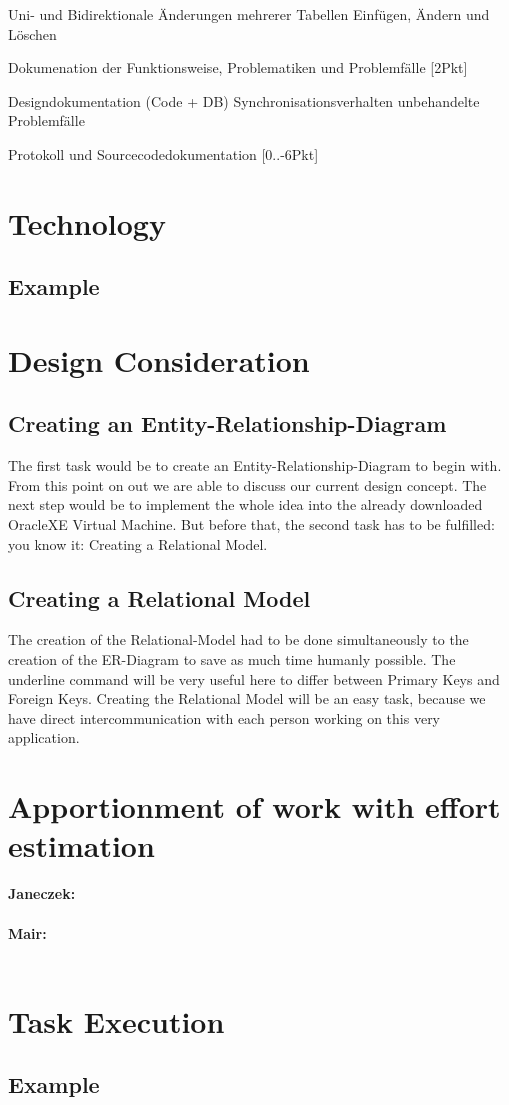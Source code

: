 \documentclass[11pt,a4paper]{article}
\begin{document}
Uni- und Bidirektionale Änderungen mehrerer Tabellen
Einfügen, Ändern und Löschen

Dokumenation der Funktionsweise, Problematiken und Problemfälle [2Pkt]

Designdokumentation (Code + DB)
Synchronisationsverhalten
unbehandelte Problemfälle

Protokoll und Sourcecodedokumentation [0..-6Pkt]

\newpage
\section{Technology}
\subsection{Example}


\newpage
\section{Design Consideration}
\subsection{Creating an Entity-Relationship-Diagram}
The first task would be to create an Entity-Relationship-Diagram to begin with. From this point on out we are able to discuss our current design concept. The next step would be to implement the whole idea into the already downloaded OracleXE Virtual Machine. But before that, the second task has to be fulfilled: you know it: Creating a Relational Model.
\subsection{Creating a Relational Model}
The creation of the Relational-Model had to be done simultaneously to the creation of the ER-Diagram to save as much time humanly possible. The underline command will be very useful here to differ between Primary Keys and Foreign Keys. Creating the Relational Model will be an easy task, because we have direct intercommunication with each person working on this very application.

\newpage
\section{Apportionment of work with effort estimation}

\textbf{Janeczek:} \\ \\
\textbf{Mair:} \\ \\

\newpage
\section{Task Execution}
\subsection{Example}

\newpage
\end{document}
